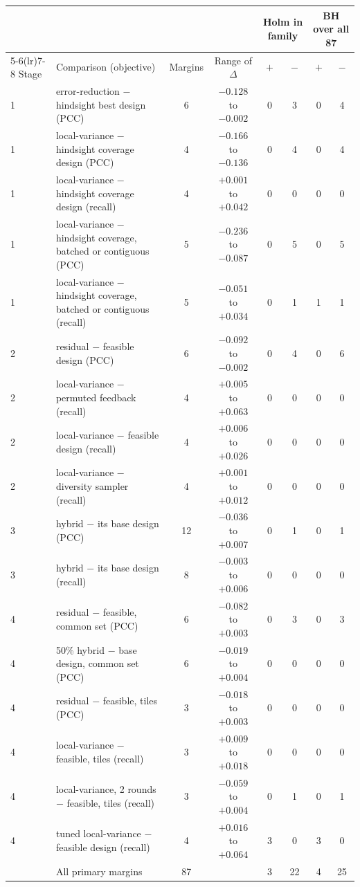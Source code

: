 \begin{tabular}{llcccccc}
\toprule
 & & & & \multicolumn{2}{c}{Holm in family} & \multicolumn{2}{c}{BH over all 87} \\
\cmidrule(lr){5-6}\cmidrule(lr){7-8}
Stage & Comparison (objective) & Margins & Range of $\Delta$ & $+$ & $-$ & $+$ & $-$ \\
\midrule
1 & error-reduction $-$ hindsight best design (PCC) & 6 & $-0.128$ to $-0.002$ & 0 & 3 & 0 & 4 \\
1 & local-variance $-$ hindsight coverage design (PCC) & 4 & $-0.166$ to $-0.136$ & 0 & 4 & 0 & 4 \\
1 & local-variance $-$ hindsight coverage design (recall) & 4 & ${+}0.001$ to ${+}0.042$ & 0 & 0 & 0 & 0 \\
1 & local-variance $-$ hindsight coverage, batched or contiguous (PCC) & 5 & $-0.236$ to $-0.087$ & 0 & 5 & 0 & 5 \\
1 & local-variance $-$ hindsight coverage, batched or contiguous (recall) & 5 & $-0.051$ to ${+}0.034$ & 0 & 1 & 1 & 1 \\
\midrule
2 & residual $-$ feasible design (PCC) & 6 & $-0.092$ to $-0.002$ & 0 & 4 & 0 & 6 \\
2 & local-variance $-$ permuted feedback (recall) & 4 & ${+}0.005$ to ${+}0.063$ & 0 & 0 & 0 & 0 \\
2 & local-variance $-$ feasible design (recall) & 4 & ${+}0.006$ to ${+}0.026$ & 0 & 0 & 0 & 0 \\
2 & local-variance $-$ diversity sampler (recall) & 4 & ${+}0.001$ to ${+}0.012$ & 0 & 0 & 0 & 0 \\
\midrule
3 & hybrid $-$ its base design (PCC) & 12 & $-0.036$ to ${+}0.007$ & 0 & 1 & 0 & 1 \\
3 & hybrid $-$ its base design (recall) & 8 & $-0.003$ to ${+}0.006$ & 0 & 0 & 0 & 0 \\
\midrule
4 & residual $-$ feasible, common set (PCC) & 6 & $-0.082$ to ${+}0.003$ & 0 & 3 & 0 & 3 \\
4 & 50\% hybrid $-$ base design, common set (PCC) & 6 & $-0.019$ to ${+}0.004$ & 0 & 0 & 0 & 0 \\
4 & residual $-$ feasible, tiles (PCC) & 3 & $-0.018$ to ${+}0.003$ & 0 & 0 & 0 & 0 \\
4 & local-variance $-$ feasible, tiles (recall) & 3 & ${+}0.009$ to ${+}0.018$ & 0 & 0 & 0 & 0 \\
4 & local-variance, 2 rounds $-$ feasible, tiles (recall) & 3 & $-0.059$ to ${+}0.004$ & 0 & 1 & 0 & 1 \\
4 & tuned local-variance $-$ feasible design (recall) & 4 & ${+}0.016$ to ${+}0.064$ & 3 & 0 & 3 & 0 \\
\midrule
 & All primary margins & 87 & & 3 & 22 & 4 & 25 \\
\bottomrule
\end{tabular}